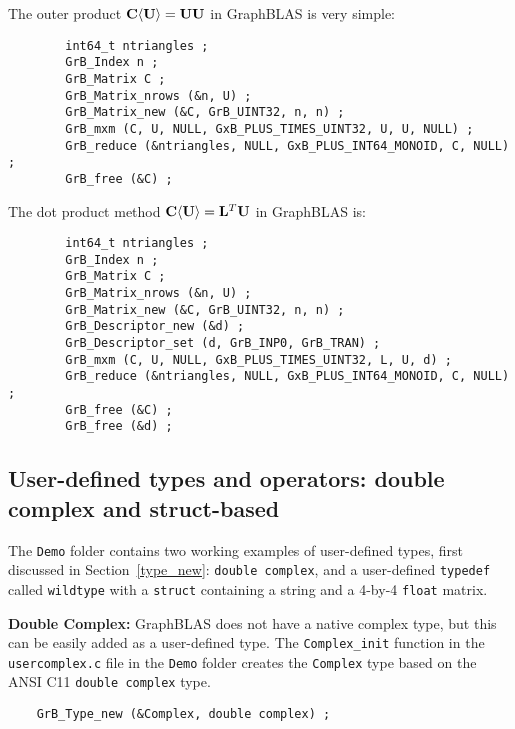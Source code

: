 \documentclass[12pt]{article}
\begin{document}
The outer product
${\bf C \langle U \rangle} = {\bf UU}$
in GraphBLAS is very simple:

{\footnotesize
\begin{verbatim}
        int64_t ntriangles ;
        GrB_Index n ;
        GrB_Matrix C ;
        GrB_Matrix_nrows (&n, U) ;
        GrB_Matrix_new (&C, GrB_UINT32, n, n) ;
        GrB_mxm (C, U, NULL, GxB_PLUS_TIMES_UINT32, U, U, NULL) ;
        GrB_reduce (&ntriangles, NULL, GxB_PLUS_INT64_MONOID, C, NULL) ;
        GrB_free (&C) ;
\end{verbatim}
}

The dot product method
${ \bf C \langle U \rangle} = {\bf L}^T{\bf U}$
in GraphBLAS is:

{\footnotesize
\begin{verbatim}
        int64_t ntriangles ;
        GrB_Index n ;
        GrB_Matrix C ;
        GrB_Matrix_nrows (&n, U) ;
        GrB_Matrix_new (&C, GrB_UINT32, n, n) ;
        GrB_Descriptor_new (&d) ;
        GrB_Descriptor_set (d, GrB_INP0, GrB_TRAN) ;
        GrB_mxm (C, U, NULL, GxB_PLUS_TIMES_UINT32, L, U, d) ;
        GrB_reduce (&ntriangles, NULL, GxB_PLUS_INT64_MONOID, C, NULL) ;
        GrB_free (&C) ;
        GrB_free (&d) ;
\end{verbatim}
}

\newpage
\subsection{User-defined types and operators: double complex and struct-based}
\label{user}

The \verb'Demo' folder contains two working examples of user-defined types,
first discussed in Section~\ref{type_new}: \verb'double complex', and a
user-defined \verb'typedef' called \verb'wildtype' with a \verb'struct'
containing a string and a 4-by-4 \verb'float' matrix.

{\bf Double Complex:}
GraphBLAS does not have a native complex type, but this can be easily added
as a user-defined type.  The \verb'Complex_init' function in the
\verb'usercomplex.c' file in the \verb'Demo' folder creates the
\verb'Complex' type based on the ANSI C11 \verb'double complex' type.

    {\footnotesize
    \begin{verbatim}
    GrB_Type_new (&Complex, double complex) ; \end{verbatim}}
\end{document}
